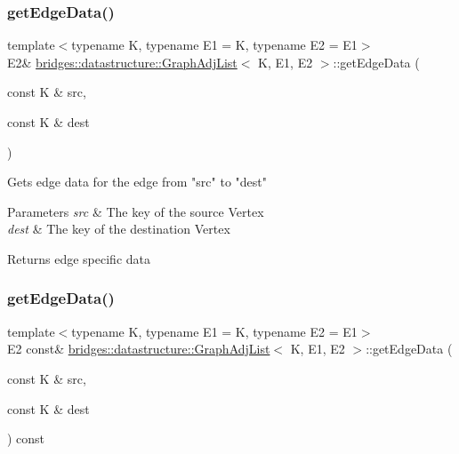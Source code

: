 \subsubsection{\texorpdfstring{getEdgeData()}{getEdgeData()}\hspace{0.1cm}{\footnotesize\ttfamily [1/2]}}
{\footnotesize\ttfamily template$<$typename K, typename E1 = K, typename E2 = E1$>$ \\
E2\& \mbox{\hyperlink{classbridges_1_1datastructure_1_1_graph_adj_list}{bridges\+::datastructure\+::\+Graph\+Adj\+List}}$<$ K, E1, E2 $>$\+::get\+Edge\+Data (\begin{DoxyParamCaption}\item[{const K \&}]{src,  }\item[{const K \&}]{dest }\end{DoxyParamCaption})\hspace{0.3cm}{\ttfamily [inline]}}

\begin{DoxyVerb}Gets edge data for the edge from "src" to "dest"
\end{DoxyVerb}



\begin{DoxyParams}{Parameters}
{\em src} & The key of the source Vertex \\
\hline
{\em dest} & The key of the destination Vertex\\
\hline
\end{DoxyParams}
\begin{DoxyReturn}{Returns}
edge specific data 
\end{DoxyReturn}
\mbox{\label{classbridges_1_1datastructure_1_1_graph_adj_list_a5c2cdffda7c983c3141ae36acc2b698d}} 
\subsubsection{\texorpdfstring{getEdgeData()}{getEdgeData()}\hspace{0.1cm}{\footnotesize\ttfamily [2/2]}}
{\footnotesize\ttfamily template$<$typename K, typename E1 = K, typename E2 = E1$>$ \\
E2 const\& \mbox{\hyperlink{classbridges_1_1datastructure_1_1_graph_adj_list}{bridges\+::datastructure\+::\+Graph\+Adj\+List}}$<$ K, E1, E2 $>$\+::get\+Edge\+Data (\begin{DoxyParamCaption}\item[{const K \&}]{src,  }\item[{const K \&}]{dest }\end{DoxyParamCaption}) const\hspace{0.3cm}{\ttfamily [inline]}}

